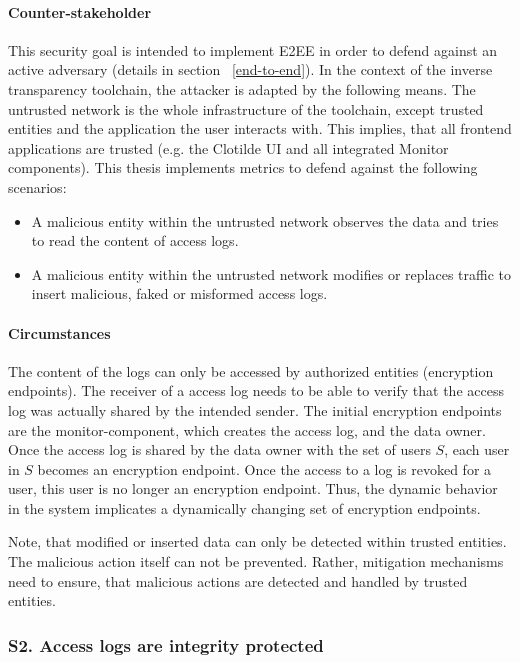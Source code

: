 \documentclass[../main.tex]{subfiles}
\begin{document}
\paragraph{Counter-stakeholder}
This security goal is intended to implement E2EE in order to defend against an active adversary (details in section ~\ref{end-to-end}).
In the context of the inverse transparency toolchain, the attacker is adapted by the following means. 
The untrusted network is the whole infrastructure of the toolchain, except trusted entities and the application the user interacts with.
This implies, that all frontend applications are trusted (e.g. the Clotilde UI and all integrated Monitor components).
This thesis implements metrics to defend against the following scenarios:
\begin{itemize}
    \item A malicious entity within the untrusted network observes the data and tries to read the content of access logs.
    \item A malicious entity within the untrusted network modifies or replaces traffic to insert malicious, faked or misformed access logs.
\end{itemize}
\paragraph{Circumstances}
The content of the logs can only be accessed by authorized entities (encryption endpoints).
The receiver of a access log needs to be able to verify that the access log was actually shared by the intended sender. 
The initial encryption endpoints are the monitor-component, which creates the access log, and the data owner.
Once the access log is shared by the data owner with the set of users $S$, each user in $S$ becomes an encryption endpoint.
Once the access to a log is revoked for a user, this user is no longer an encryption endpoint.
Thus, the dynamic behavior in the system implicates a dynamically changing set of encryption endpoints.

Note, that modified or inserted data can only be detected within trusted entities.
The malicious action itself can not be prevented.
Rather, mitigation mechanisms need to ensure, that malicious actions are detected and handled by trusted entities.

\subsubsection{S2. Access logs are integrity protected}
\end{document}
